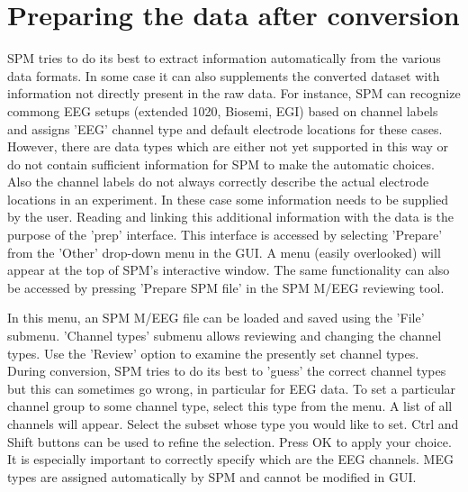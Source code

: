 \section{Preparing the data after conversion}
SPM tries to do its best to extract information automatically
from the various data formats. In some case it can also supplements
the converted dataset with information not directly present in the raw data.
For instance, SPM can recognize commong EEG setups (extended 1020, Biosemi, EGI)
based on channel labels and assigns 'EEG' channel type and default electrode locations
for these cases. However, there are data types which are either not yet supported in this way
or do not contain sufficient information for SPM to make the automatic choices.
Also the channel labels do not always correctly describe the actual electrode
locations in an experiment. In these case some information needs 
to be supplied by the user. Reading and linking this additional information with the data is the
purpose of the 'prep' interface. This interface is accessed by
selecting 'Prepare' from the 'Other' drop-down menu in the GUI.  A menu
(easily overlooked) will appear at the top of SPM's interactive 
window. The same functionality can also be accessed by pressing 'Prepare SPM file' in
the SPM M/EEG reviewing tool.

In this menu, an SPM M/EEG file can be loaded and saved using the 'File'
submenu. 'Channel types' submenu allows reviewing and
changing the channel types. Use the 'Review' option to examine the
presently set channel types. During conversion, SPM tries to do its
best to 'guess' the correct channel types but this can sometimes go
wrong, in particular for EEG data. To set a particular channel group
to some channel type, select this type from the menu. A list of all
channels will appear. Select the subset whose type you would like to
set. Ctrl and Shift buttons can be used to refine the selection. Press
OK to apply your choice. It is especially important to correctly specify
which are the EEG channels. MEG types are assigned automatically by SPM
and cannot be modified in GUI.  

